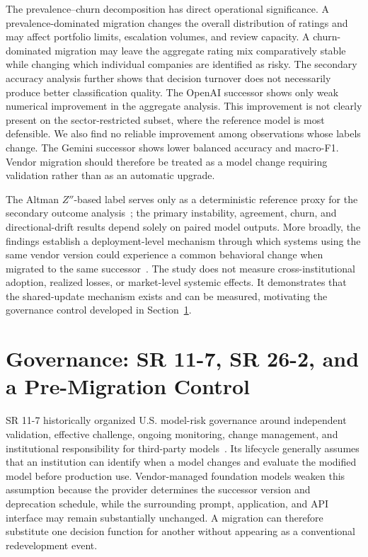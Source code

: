 \documentclass{ieeeaccess}
\begin{document}
The prevalence--churn decomposition has direct operational significance. A prevalence-dominated
migration changes the overall distribution of ratings and may affect portfolio limits, escalation
volumes, and review capacity. A churn-dominated migration may leave the aggregate rating mix
comparatively stable while changing which individual companies are identified as risky. The
secondary accuracy analysis further shows that decision turnover does not necessarily produce better
classification quality. The OpenAI successor shows only weak numerical improvement in the aggregate
analysis. This improvement is not clearly present on the sector-restricted subset, where the
reference model is most defensible. We also find no reliable improvement among observations whose
labels change. The Gemini successor shows lower balanced accuracy and macro-F1.
Vendor migration should therefore be treated as a model change requiring validation rather than as an automatic upgrade.

The Altman $Z''$-based label serves only as a deterministic reference proxy for the secondary outcome analysis~\cite{altman_em}; the primary instability, agreement, churn, and directional-drift results depend solely on paired model outputs. More broadly, the findings establish a deployment-level mechanism through which systems using the same vendor version could experience a common behavioral change when migrated to the same successor~\cite{kim,monoculture,esrb}. The study does not measure cross-institutional adoption, realized losses, or market-level systemic effects. It demonstrates that the shared-update mechanism exists and can be measured, motivating the governance control developed in Section~\ref{sec:gov}.

\section{Governance: SR 11-7, SR 26-2, and a Pre-Migration Control}
\label{sec:gov}
SR 11-7 historically organized U.S. model-risk governance around independent validation, effective challenge, ongoing monitoring, change management, and institutional responsibility for third-party models~\cite{sr117}. Its lifecycle generally assumes that an institution can identify when a model changes and evaluate the modified model before production use. Vendor-managed foundation models weaken this assumption because the provider determines the successor version and deprecation schedule, while the surrounding prompt, application, and API interface may remain substantially unchanged. A migration can therefore substitute one decision function for another without appearing as a conventional redevelopment event.
\end{document}
